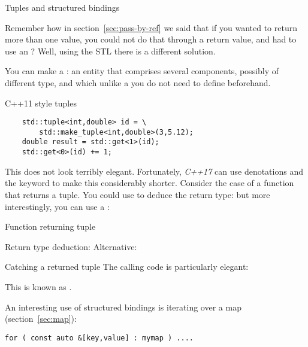 
 {Tuples and structured bindings}
\label{sec:tuple}

Remember how in section~\ref{sec:pass-by-ref} we said that if you
wanted to return more than one value, you could not do that through a
return value, and had to use an ?
Well, using the \ac{STL} there is a different solution.

You can make a : an entity that comprises several
components, possibly of different type, and which unlike a
 you do not need to define beforehand.

\lstset{style=reviewcode,language=C++}
\begin{block}{C++11 style tuples}
  \label{sl:tuple11}
  \begin{lstlisting}
    std::tuple<int,double> id = \
        std::make_tuple<int,double>(3,5.12);
    double result = std::get<1>(id);
    std::get<0>(id) += 1;
  \end{lstlisting}
\end{block}

This does not look terribly elegant. Fortunately,
\emph{C++17} can use denotations and the 
keyword to make this considerably shorter. Consider the case of a
function that returns a tuple. You could use \n{auto} to deduce the
return type:
%
%
but more interestingly, you can use a
:
%

\begin{slide}{Function returning tuple}
  \label{sl:tuplefun}
  \begin{multicols}{2}
    Return type deduction:
    \columnbreak
    Alternative:
  \end{multicols}
\end{slide}

\begin{block}{Catching a returned tuple}
  \label{sl:catch-tuple}
  The calling code is particularly elegant:

  This is known as .
\end{block}

An interesting use of structured bindings is iterating over a map (section~\ref{sec:map}):
\begin{lstlisting}
for ( const auto &[key,value] : mymap ) ....
\end{lstlisting}

